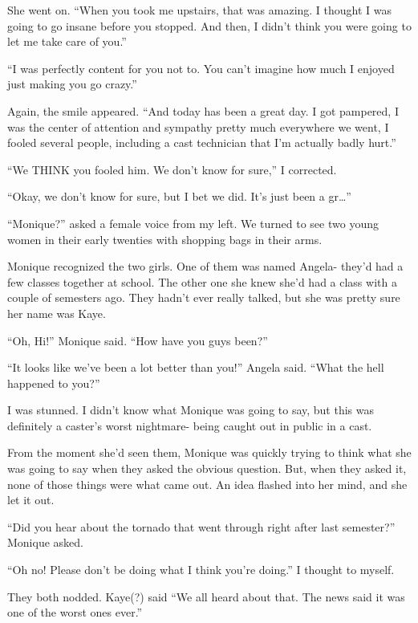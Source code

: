 She went on. ``When you took me upstairs, that was amazing. I thought I was going to go
insane before you stopped. And then, I didn't think you were going to let me take care of you.''

``I was perfectly content for you not to. You can't imagine how much I enjoyed just making
you go crazy.''

Again, the smile appeared. ``And today has been a great day. I got pampered, I was the
center of attention and sympathy pretty much everywhere we went, I fooled several people,
including a cast technician that I'm actually badly hurt.''

``We THINK you fooled him. We don't know for sure,'' I corrected.

``Okay, we don't know for sure, but I bet we did. It's just been a gr…''

``Monique?'' asked a female voice from my left. We turned to see two young women in their
early twenties with shopping bags in their arms.

\begin{thought}
Monique recognized the two girls. One of them was named Angela- they'd had a few classes
together at school. The other one she knew she'd had a class with a couple of semesters ago.
They hadn't ever really talked, but she was pretty sure her name was Kaye.
\end{thought}

``Oh, Hi!'' Monique said. ``How have you guys been?''

``It looks like we've been a lot better than you!'' Angela said. ``What the hell happened to
you?''

I was stunned. I didn't know what Monique was going to say, but this was definitely a
caster's worst nightmare- being caught out in public in a cast.

\begin{thought}
From the moment she'd seen them, Monique was quickly trying to think what she was going to
say when they asked the obvious question. But, when they asked it, none of those things were
what came out. An idea flashed into her mind, and she let it out.
\end{thought}

``Did you hear about the tornado that went through right after last semester?'' Monique
asked.

``Oh no! Please don't be doing what I think you're doing.'' I thought to myself.

They both nodded. Kaye(?) said ``We all heard about that. The news said it was one of the
worst ones ever.''

